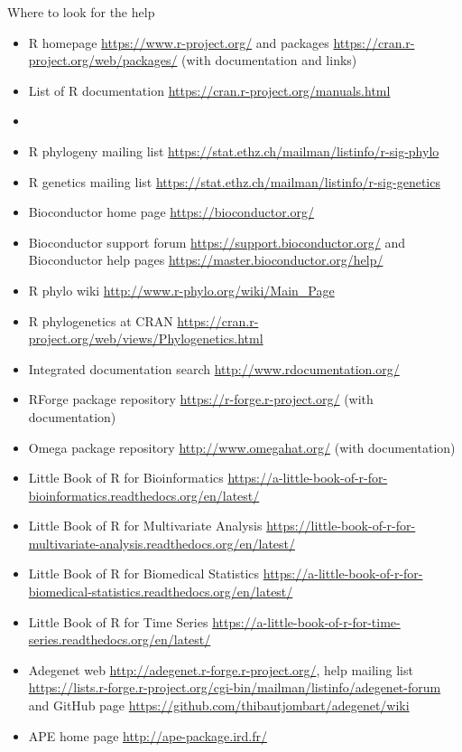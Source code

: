 \documentclass[compress, ucs, xelatex, 11pt, xcolor=svgnames,
  hyperref={
    bookmarks=true,
    unicode=true,
    colorlinks=true,
    pdftitle={Molecular data in R},
    plainpages=false,
    pdfauthor={Vojtech Zeisek},
    pdfsubject={Course about phylogeny and evolution in R},
    pdfcreator={XeLaTeX},
    pdfkeywords={R, evolution, phylogeny, molecular data},
    linkcolor=Tomato,
    anchorcolor=SaddleBrown,
    citecolor=Goldenrod,
    filecolor=DarkMagenta,
    menucolor=Sienna,
    urlcolor=DarkTurquoise,
    pdftex},
  url={hyphens, lowtilde} %
  ]{beamer}
\begin{document}
\begin{frame}[allowframebreaks]{Where to look for the help}
\begin{itemize}
 \item R homepage \url{https://www.r-project.org/} and packages \url{https://cran.r-project.org/web/packages/} (with documentation and links)
 \item List of R documentation \url{https://cran.r-project.org/manuals.html}
 \item \item R phylogeny mailing list \url{https://stat.ethz.ch/mailman/listinfo/r-sig-phylo}
 \item R genetics mailing list \url{https://stat.ethz.ch/mailman/listinfo/r-sig-genetics}
 \item Bioconductor home page \url{https://bioconductor.org/}
 \item Bioconductor support forum \url{https://support.bioconductor.org/} and Bioconductor help pages \url{https://master.bioconductor.org/help/}
 \item R phylo wiki \url{http://www.r-phylo.org/wiki/Main_Page}
 \item R phylogenetics at CRAN \url{https://cran.r-project.org/web/views/Phylogenetics.html}
 \item Integrated documentation search \url{http://www.rdocumentation.org/}
 \item RForge package repository \url{https://r-forge.r-project.org/} (with documentation)
 \item Omega package repository \url{http://www.omegahat.org/} (with documentation)
 \item Little Book of R for Bioinformatics \url{https://a-little-book-of-r-for-bioinformatics.readthedocs.org/en/latest/}
 \item Little Book of R for Multivariate Analysis \url{https://little-book-of-r-for-multivariate-analysis.readthedocs.org/en/latest/}
 \item Little Book of R for Biomedical Statistics \url{https://a-little-book-of-r-for-biomedical-statistics.readthedocs.org/en/latest/}
 \item Little Book of R for Time Series \url{https://a-little-book-of-r-for-time-series.readthedocs.org/en/latest/}
 \item Adegenet web \url{http://adegenet.r-forge.r-project.org/}, help mailing list \url{https://lists.r-forge.r-project.org/cgi-bin/mailman/listinfo/adegenet-forum} and GitHub page \url{https://github.com/thibautjombart/adegenet/wiki}
 \item APE home page \url{http://ape-package.ird.fr/}

\end{itemize}
\end{frame}
\end{document}
